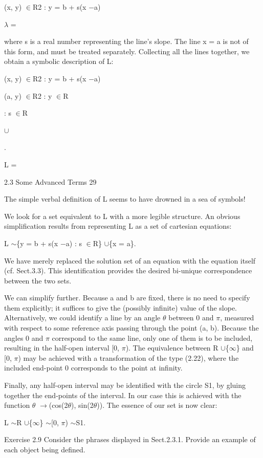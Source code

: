 \documentclass[11pt]{article}
\theoremstyle{plain}
\theoremstyle{definition}
\begin{document}
(x, y) $\in$R2 : y = b + s(x $-$a)

$\lambda$ =

where s is a real number representing the line's slope. The line x = a is not of this form, and must be treated separately. Collecting all the lines together, we obtain a symbolic description of L:

(x, y) $\in$R2 : y = b + s(x $-$a)

(a, y) $\in$R2 : y $\in$R

: s $\in$R

$\cup$

.

L =

2.3 Some Advanced Terms 29

The simple verbal definition of L seems to have drowned in a sea of symbols!

We look for a set equivalent to L with a more legible structure. An obvious simplification results from representing L as a set of cartesian equations:

L $\sim$\{y = b + s(x $-$a) : s $\in$R\} $\cup$\{x = a\}.

We have merely replaced the solution set of an equation with the equation itself (cf. Sect.3.3). This identification provides the desired bi-unique correspondence between the two sets.

We can simplify further. Because a and b are fixed, there is no need to specify them explicitly; it suffices to give the (possibly infinite) value of the slope. Alternatively, we could identify a line by an angle $\theta$ between 0 and $\pi$, measured with respect to some reference axis passing through the point (a, b). Because the angles 0 and $\pi$ correspond to the same line, only one of them is to be included, resulting in the half-open interval [0, $\pi$). The equivalence between R $\cup$\{$\infty$\} and [0, $\pi$) may be achieved with a transformation of the type (2.22), where the included end-point 0 corresponds to the point at infinity.

Finally, any half-open interval may be identified with the circle S1, by gluing together the end-points of the interval. In our case this is achieved with the function $\theta$ $\to$(cos(2$\theta$), sin(2$\theta$)). The essence of our set is now clear:

L $\sim$R $\cup$\{$\infty$\} $\sim$[0, $\pi$) $\sim$S1.

Exercise 2.9 Consider the phrases displayed in Sect.2.3.1. Provide an example of each object being defined.
\end{document}
